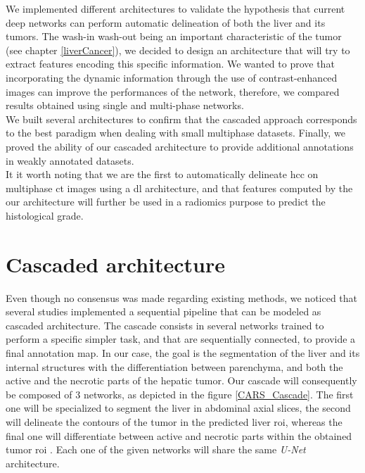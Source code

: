 We implemented different architectures to validate the hypothesis that
current deep networks can perform automatic delineation of both the
liver and its tumors. The wash-in wash-out being an important characteristic of the tumor (see chapter \ref{liverCancer}), we decided to design an architecture that will try to extract features encoding this specific information. We wanted to prove that incorporating the dynamic information through the use of contrast-enhanced images can improve the performances of the network, therefore, we compared results obtained using single and multi-phase networks. \\
We built several architectures to confirm that the cascaded approach corresponds to the best paradigm when dealing with small multiphase datasets.
Finally, we proved the ability of our cascaded architecture to provide additional annotations in weakly annotated datasets.\\
It it worth noting that we are the first to automatically 
delineate \ac{hcc} on multiphase \ac{ct} images using a \ac{dl} architecture, and that features computed by the our architecture will further be used in a radiomics purpose to predict the histological grade.



\section{Cascaded architecture}

Even though no consensus was made regarding existing methods, we noticed that
several studies implemented a sequential pipeline that can be modeled as
cascaded architecture. The cascade consists in several networks trained
to perform a specific simpler task, and that are sequentially connected, to
provide a final annotation map. In our case, the goal is the
segmentation of the liver and its internal structures with the
differentiation between parenchyma, and both the active and the necrotic
parts of the hepatic tumor.
Our cascade will consequently be composed of 3 networks, as depicted
in the figure \ref{CARS_Cascade}. The first one will be specialized to segment the liver in
abdominal axial slices, the second will delineate the contours of the
tumor in the predicted liver \ac{roi}, whereas the final one will
differentiate between active and necrotic parts within the obtained
tumor \ac{roi} \cite{Ouhmich2019}.
Each one of the given networks will share the same \emph{U-Net}
architecture.


